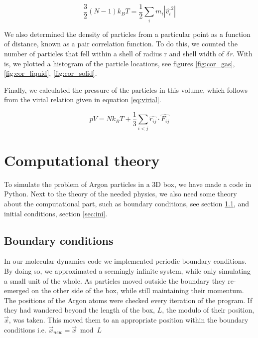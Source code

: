 \documentclass[a4paper,twoside,12pt]{article}
\begin{document}
\begin{equation}
\label{eq:Maxwell-Boltzmann}
\frac{3}{2}(N-1)k_{B}T = \frac{1}{2}\sum_{i}m_{i}|\hat{v_{i}}^2|
\end{equation}

\noindent We also determined the density of particles from a particular point as a function of distance, known as a pair correlation function. To do this, we counted the number of particles that fell within a shell of radius r and shell width of $\delta$\textit{r}. With is, we plotted a histogram of the particle locations, see figures \ref{fig:cor_gas}, \ref{fig:cor_liquid}, \ref{fig:cor_solid}.
\vspace{5mm}

\noindent Finally, we calculated the pressure of the particles in this volume, which follows from the virial relation given in equation \ref{eq:virial}. 

\begin{equation}
\label{eq:virial}
pV = Nk_{B}T+\frac{1}{3}\sum_{i<j}\hat{r_{ij}}\cdot\hat{F_{ij}}
\end{equation}


\section{Computational theory}

\noindent To simulate the problem of Argon particles in a 3D box, we have made a code in Python. Next to the theory of the needed physics, we also need some theory about the computational part, such as boundary conditions, see section \ref{sec:boun}, and initial conditions, section \ref{sec:ini}.

\subsection{Boundary conditions}\label{sec:boun}

\noindent In our molecular dynamics code we implemented periodic boundary conditions. By doing so, we approximated a seemingly infinite system, while only simulating a small unit of the whole. As particles moved outside the boundary they re-emerged on the other side of the box, while still maintaining their momentum.
The positions of the Argon atoms were checked every iteration of the program. If they had wandered beyond the length of the box, $L$, the modulo of their position, $\vec{x}$, was taken. This moved them to an appropriate position within the boundary conditions i.e. $\vec{x}_{new}=\vec{x} \bmod L$
\vspace{5mm}
\end{document}
